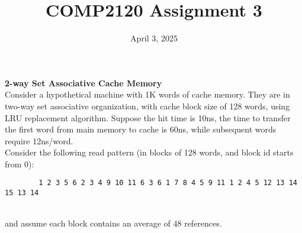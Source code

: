 \documentclass[answers]{exam}
\title{COMP2120 Assignment 3}
\date{April 3, 2025}
\begin{document}
\maketitle

\begin{questions}
    \question \textbf{2-way Set Associative Cache Memory} \\
    Consider a hypothetical machine with 1K words of cache memory. They are in two-way set associative organization, with cache block size of 128 words, using LRU replacement algorithm.
    Suppose the hit time is 10ns, the time to transfer the first word from main memory to cache is 60ns, while subsequent words require 12ns/word. \\
    Consider the following read pattern (in blocks of 128 words, and block id starts from 0):
    \begin{listing}[htb]
        \centering
        \begin{verbatim}
        1 2 3 5 6 2 3 4 9 10 11 6 3 6 1 7 8 4 5 9 11 1 2 4 5 12 13 14 15 13 14
        \end{verbatim}
    \end{listing} \\
    and assume each block contains an average of 48 references.

\end{questions}
\end{document}
